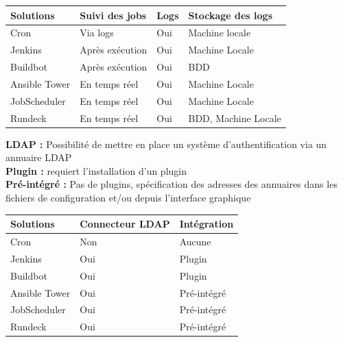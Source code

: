 \documentclass[12pt]{article}
\begin{document}
\begin{center}
\begin{tabular}{|l|l|l|l|}
\hline
Solutions     & Suivi des jobs  & Logs & Stockage des logs   \\ \hline
Cron          & Via logs        & Oui  & Machine locale      \\ \hline
Jenkins       & Après exécution & Oui  & Machine Locale      \\ \hline
Buildbot      & Après exécution & Oui  & BDD                 \\ \hline
Ansible Tower & En temps réel   & Oui  & Machine Locale      \\ \hline
JobScheduler  & En temps réel   & Oui  & Machine Locale      \\ \hline
Rundeck       & En temps réel   & Oui  & BDD, Machine Locale \\ \hline
\end{tabular}
\end{center}
\vspace{0.5cm}
\textbf{LDAP :}
Possibilité de mettre en place un système d'authentification via un annuaire LDAP
\vspace{0.2cm}
\\
\textbf{Plugin :} requiert l'installation d'un plugin
\vspace{0.2cm}
\\
\textbf{Pré-intégré :} Pas de plugins, spécification des adresses des annuaires dans les fichiers de configuration et/ou depuis l'interface graphique
\vspace{0.5cm}
\\
\begin{center}
\begin{tabular}{|l|l|l|}
\hline
Solutions     & Connecteur LDAP & Intégration \\ \hline
Cron          & Non             & Aucune      \\ \hline
Jenkins       & Oui             & Plugin      \\ \hline
Buildbot      & Oui             & Plugin      \\ \hline
Ansible Tower & Oui             & Pré-intégré \\ \hline
JobScheduler  & Oui             & Pré-intégré \\ \hline
Rundeck       & Oui             & Pré-intégré \\ \hline
\end{tabular}
\end{center}
\end{document}

